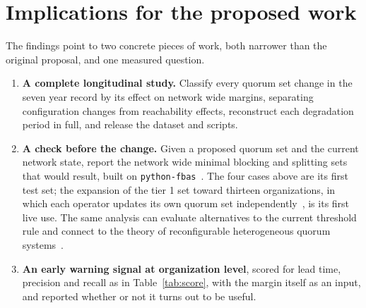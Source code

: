 \documentclass[11pt,a4paper]{article}
\newcommand{\toolname}[1]{\texttt{#1}}
\begin{document}
\section{Implications for the proposed work}
The findings point to two concrete pieces of work, both narrower than the original proposal, and one measured question.
\begin{enumerate}[nosep,leftmargin=1.6em]
\item \textbf{A complete longitudinal study.} Classify every quorum set change in the seven year record by its effect on network wide margins, separating configuration changes from reachability effects, reconstruct each degradation period in full, and release the dataset and scripts.
\item \textbf{A check before the change.} Given a proposed quorum set and the current network state, report the network wide minimal blocking and splitting sets that would result, built on \toolname{python-fbas}~\cite{pythonfbas}. The four cases above are its first test set; the expansion of the tier 1 set toward thirteen organizations, in which each operator updates its own quorum set independently~\cite{sdf2025}, is its first live use. The same analysis can evaluate alternatives to the current threshold rule and connect to the theory of reconfigurable heterogeneous quorum systems~\cite{li2024}.
\item \textbf{An early warning signal at organization level}, scored for lead time, precision and recall as in Table~\ref{tab:score}, with the margin itself as an input, and reported whether or not it turns out to be useful.
\end{enumerate}
\end{document}

